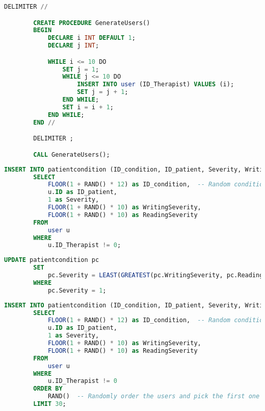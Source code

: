\documentclass{article}
\begin{document}
    \begin{lstlisting}[language=SQL, breaklines, caption=Generazione degli utenti]
        DELIMITER //

        CREATE PROCEDURE GenerateUsers()
        BEGIN
            DECLARE i INT DEFAULT 1;
            DECLARE j INT;

            WHILE i <= 10 DO
                SET j = 1;
                WHILE j <= 10 DO
                    INSERT INTO user (ID_Therapist) VALUES (i);
                    SET j = j + 1;
                END WHILE;
                SET i = i + 1;
            END WHILE;
        END //

        DELIMITER ;

        CALL GenerateUsers();
    \end{lstlisting}

    \pagebreak

    \begin{lstlisting}[language=SQL, breaklines, caption=Generazione delle severity (tutti gli user)]
        INSERT INTO patientcondition (ID_condition, ID_patient, Severity, WritingSeverity, ReadingSeverity)
        SELECT
            FLOOR(1 + RAND() * 12) as ID_condition,  -- Random condition ID (1 to 12)
            u.ID as ID_patient,
            1 as Severity,
            FLOOR(1 + RAND() * 10) as WritingSeverity,
            FLOOR(1 + RAND() * 10) as ReadingSeverity
        FROM
            user u
        WHERE
            u.ID_Therapist != 0;
    \end{lstlisting}

    \begin{lstlisting}[language=SQL, breaklines, caption=Generazione delle severity (tutti gli user) pt.2]
        UPDATE patientcondition pc
        SET
            pc.Severity = LEAST(GREATEST(pc.WritingSeverity, pc.ReadingSeverity) + IF(RAND() < 0.5, -1, 1), 10)
        WHERE
            pc.Severity = 1;
    \end{lstlisting}

    \begin{lstlisting}[language=SQL, breaklines, caption=Generazione delle severity (solo x users)]
        INSERT INTO patientcondition (ID_condition, ID_patient, Severity, WritingSeverity, ReadingSeverity)
        SELECT
            FLOOR(1 + RAND() * 12) as ID_condition,  -- Random condition ID (1 to 12)
            u.ID as ID_patient,
            1 as Severity,
            FLOOR(1 + RAND() * 10) as WritingSeverity,
            FLOOR(1 + RAND() * 10) as ReadingSeverity
        FROM
            user u
        WHERE
            u.ID_Therapist != 0
        ORDER BY
            RAND()  -- Randomly order the users and pick the first one
        LIMIT 30;
    \end{lstlisting}
\end{document}
